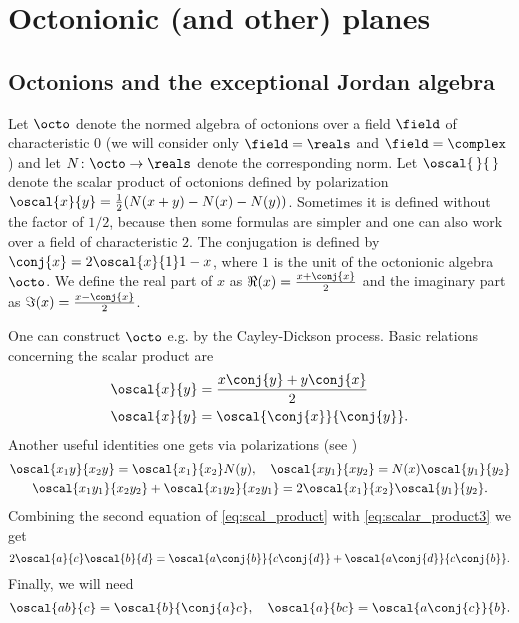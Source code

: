\section{Octonionic (and other) planes}

\subsection{Octonions and the exceptional Jordan algebra}

Let $\octo$ denote the normed algebra of octonions over a field $\field$ of characteristic $0$ (we will consider only $\field=\reals$ and $\field =\complex$) and let $N\colon\octo \to \reals$ denote the corresponding norm. Let $\oscal{\,}{\,}$ denote the scalar product of octonions  defined by polarization $\oscal{x}{y} = \frac{1}{2} (N(x+y) - N(x) - N(y))$. Sometimes it is defined without the factor of $1/2$, because then some formulas are simpler and one can also work over a field of characteristic $2$. The conjugation is defined by $\conj{x} = 2\oscal{x}{1}1 - x$, where $1$ is the unit of the octonionic algebra $\octo$. We define the real part of $x$ as $\Re(x) = \frac{x + \conj{x}}{2}$ and the imaginary part as $\Im(x) = \frac{x-\conj{x}}{2}$. 

One can construct $\octo$ e.g. by the Cayley-Dickson process. Basic relations concerning the scalar product are 
\begin{equation}\label{eq:scal_product}
\begin{aligned}
\oscal{x}{y} & = \frac{ x\conj{y} + y\conj{x}}{2}\\
\oscal{x}{y} & = \oscal{\conj{x}}{\conj{y}}.
\end{aligned}
\end{equation}
Another useful  identities one gets via polarizations (see \cite[p. 5]{springer_octonions_2000})
\begin{gather}
\oscal{x_1y}{x_2y} = \oscal{x_1}{x_2} N(y), \quad \oscal{xy_1}{xy_2} = N(x)\oscal{y_1}{y_2} \label{eq:scalar_product2}\\
\oscal{x_1y_1}{x_2y_2} + \oscal{x_1y_2}{x_2y_1} = 2\oscal{x_1}{x_2}\oscal{y_1}{y_2}.\label{eq:scalar_product3}
\end{gather}
Combining the second equation of \eqref{eq:scal_product} with \eqref{eq:scalar_product3} we get
\begin{equation}\label{eq:scalar_product4}
2\oscal{a}{c}\oscal{b}{d} = \oscal{a\conj{b}}{c\conj{d}} + \oscal{a\conj{d}}{c\conj{b}}.
\end{equation}
Finally, we will need
\begin{equation}\label{eq:scalar_product5}
\oscal{ab}{c} = \oscal{b}{\conj{a}c}, \quad \oscal{a}{bc} = \oscal{a\conj{c}}{b}.
\end{equation}

